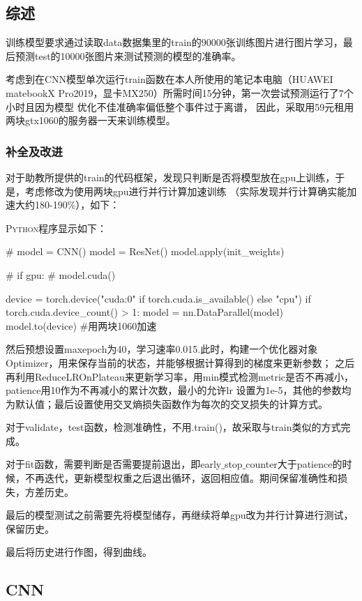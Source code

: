 \documentclass[a4paper,AutoFakeBold,AutoFakeSlant]{ctexart}
\begin{document}
\subsection{综述}

训练模型要求通过读取data数据集里的train的90000张训练图片进行图片学习，最后预测test的10000张图片来测试预测的模型的准确率。

考虑到在CNN模型单次运行train函数在本人所使用的笔记本电脑（HUAWEI matebookX Pro2019，显卡MX250）所需时间15分钟，第一次尝试预测运行了7个小时且因为模型
优化不佳准确率偏低整个事件过于离谱，
因此，采取用59元租用两块gtx1060的服务器一天来训练模型。

\subsubsection{补全及改进}

对于助教所提供的train的代码框架，发现只判断是否将模型放在gpu上训练，于是，考虑修改为使用两块gpu进行并行计算加速训练
（实际发现并行计算确实能加速大约180-190$\%$），如下：

\textsc{Python}程序显示如下：
\begin{python}
  # model = CNN()
  model = ResNet()
  model.apply(init_weights)

  # if gpu:
  #     model.cuda()

  device = torch.device("cuda:0" if torch.cuda.is_available() else "cpu")
  if torch.cuda.device_count() > 1:
      model = nn.DataParallel(model)
  model.to(device) #用两块1060加速
\end{python}

然后预想设置maxepoch为40，学习速率0.015.此时，构建一个优化器对象Optimizer，用来保存当前的状态，并能够根据计算得到的梯度来更新参数；
之后再利用ReduceLROnPlateau来更新学习率，用min模式检测metric是否不再减小，patience用10作为不再减小的累计次数，最小的允许lr
设置为1e-5，其他的参数均为默认值；最后设置使用交叉熵损失函数作为每次的交叉损失的计算方式。

对于validate，test函数，检测准确性，不用.train()，故采取与train类似的方式完成。

对于fit函数，需要判断是否需要提前退出，即early$\_$stop$\_$counter大于patience的时候，不再迭代，更新模型权重之后退出循环，返回相应值。期间保留准确性和损失，方差历史。

最后的模型测试之前需要先将模型储存，再继续将单gpu改为并行计算进行测试，保留历史。

最后将历史进行作图，得到曲线。

\subsection{CNN}
\end{document}

